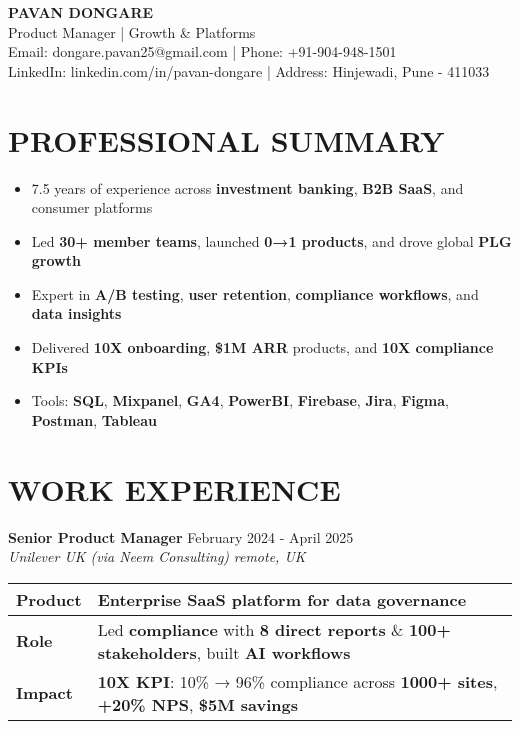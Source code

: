 \documentclass[10pt,a4paper]{article}
\newcommand{\experienceitem}[4]{
    \textbf{#1} \hfill #2 \\
    \textit{#3} \hfill \textit{#4}
}
\begin{document}
\begin{center}
    \textbf{\Large PAVAN DONGARE} \\
    \vspace{2pt}
    Product Manager | Growth \& Platforms \\
    \vspace{4pt}
    Email: dongare.pavan25@gmail.com | Phone: +91-904-948-1501 \\
    LinkedIn: linkedin.com/in/pavan-dongare | Address: Hinjewadi, Pune - 411033
\end{center}

\vspace{-8pt}

\section{PROFESSIONAL SUMMARY}
\begin{itemize}[leftmargin=*]
    \item 7.5 years of experience across \textbf{investment banking}, \textbf{B2B SaaS}, and consumer platforms
    \item Led \textbf{30+ member teams}, launched \textbf{0→1 products}, and drove global \textbf{PLG growth}
    \item Expert in \textbf{A/B testing}, \textbf{user retention}, \textbf{compliance workflows}, and \textbf{data insights}
    \item Delivered \textbf{10X onboarding}, \textbf{\$1M ARR} products, and \textbf{10X compliance KPIs}
    \item Tools: \textbf{SQL}, \textbf{Mixpanel}, \textbf{GA4}, \textbf{PowerBI}, \textbf{Firebase}, \textbf{Jira}, \textbf{Figma}, \textbf{Postman}, \textbf{Tableau}
\end{itemize}

\section{WORK EXPERIENCE}

\experienceitem{\textbf{Senior Product Manager}}{February 2024 - April 2025}{Unilever UK (via Neem Consulting)}{remote, UK}

\begin{tabularx}{\textwidth}{|>{\raggedright\arraybackslash}p{1.8cm}|X|}
\hline
\textbf{Product} & \textbf{Enterprise SaaS} platform for \textbf{data governance} \\
\hline
\textbf{Role} & Led \textbf{compliance} with \textbf{8 direct reports} \& \textbf{100+ stakeholders}, built \textbf{AI workflows} \\
\hline
\textbf{Impact} & \textbf{10X KPI}: 10\% → 96\% compliance across \textbf{1000+ sites}, \textbf{+20\% NPS}, \textbf{\$5M savings} \\
\hline
\end{tabularx}
\end{document}
